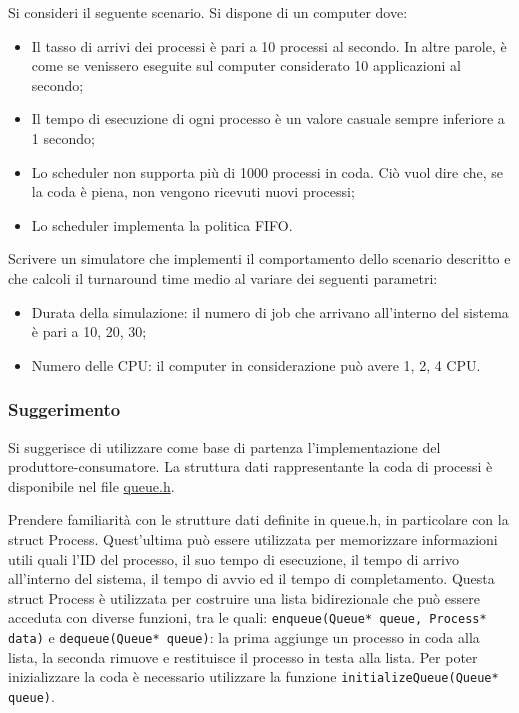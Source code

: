 \documentclass{article}
\numberwithin{equation}{subsection}
\begin{document}
Si consideri il seguente scenario. Si dispone di un computer dove:
\begin{itemize}
    \item Il tasso di arrivi dei processi è pari a 10 processi al secondo. In altre parole, è come se venissero eseguite sul computer considerato 10 applicazioni al secondo;
    \item Il tempo di esecuzione di ogni processo è un valore casuale sempre inferiore a 1 secondo;
    \item Lo scheduler non supporta più di 1000 processi in coda. Ciò vuol dire che, se la coda è piena, non vengono ricevuti nuovi processi;
    \item Lo scheduler implementa la politica FIFO.
\end{itemize}
Scrivere un simulatore che implementi il comportamento dello scenario descritto e che calcoli il turnaround time medio al variare dei seguenti parametri:
\begin{itemize}
    \item Durata della simulazione: il numero di job che arrivano all'interno del sistema è pari a 10, 20, 30;
    \item Numero delle CPU: il computer in considerazione può avere 1, 2, 4 CPU. 
\end{itemize}

\subsubsection*{Suggerimento}

Si suggerisce di utilizzare come base di partenza l'implementazione del produttore-consumatore. La struttura dati rappresentante la coda di processi è disponibile nel file \href{https://github.com/00Darxk/Sistemi-Operativi/tree/main/Esercizi/Programmazione%20Concorrente/queue.h}{queue.h}.

Prendere familiarità con le strutture dati definite in queue.h, in particolare con la struct Process. Quest'ultima può essere utilizzata per memorizzare informazioni utili quali l'ID del processo, il suo tempo di esecuzione, il tempo di arrivo all'interno del sistema, il tempo di avvio ed il tempo di completamento. Questa struct Process è utilizzata per costruire una lista bidirezionale che può essere acceduta con diverse funzioni, tra le quali: \verb|enqueue(Queue* queue, Process* data)| e \verb|dequeue(Queue* queue)|: la prima aggiunge un processo in coda alla lista, la seconda rimuove e restituisce il processo in testa alla lista. Per poter inizializzare la coda è necessario utilizzare la funzione \verb|initializeQueue(Queue* queue)|. 
\end{document}
